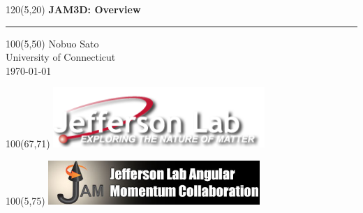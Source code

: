 \begin{frame}

\begin{textblock}{120}(5,20) 
\Large
\textbf{JAM3D: Overview}
\\
{\color{b}\noindent\rule{10cm}{1.4pt}}
\end{textblock}

\begin{textblock}{100}(5,50) 
\Large
Nobuo Sato\\ 
\normalsize
University of Connecticut \\
\today
\end{textblock}


\begin{textblock}{100}(67,71) 
\includegraphics[width=0.6\textwidth]{gallery/logos/jlab}
\end{textblock}

\begin{textblock}{100}(5,75) 
\includegraphics[width=0.6\textwidth]{gallery/logos/jam}
\end{textblock}

\end{frame}




